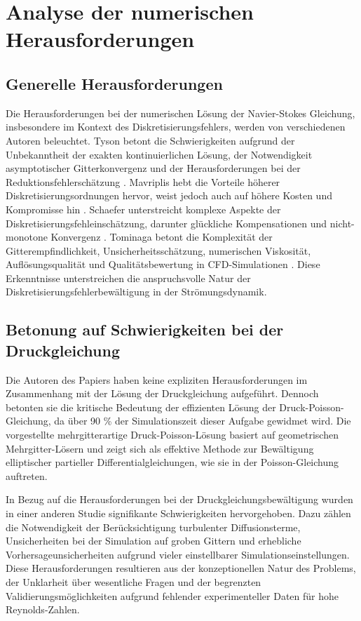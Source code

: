 \section{Analyse der numerischen Herausforderungen}

\subsection{Generelle Herausforderungen}
Die Herausforderungen bei der numerischen Lösung der Navier-Stokes Gleichung, insbesondere im Kontext des Diskretisierungsfehlers, werden von verschiedenen Autoren beleuchtet. Tyson betont die Schwierigkeiten aufgrund der Unbekanntheit der exakten kontinuierlichen Lösung, der Notwendigkeit asymptotischer Gitterkonvergenz und der Herausforderungen bei der Reduktionsfehlerschätzung \parencite{tysonHigherorderErrorEstimation2019}. Mavriplis hebt die Vorteile höherer Diskretisierungsordnungen hervor, weist jedoch auch auf höhere Kosten und Kompromisse hin \parencite{mavriplisProgressCFDDiscretizations2019}. Schaefer unterstreicht komplexe Aspekte der Diskretisierungsfehleinschätzung, darunter glückliche Kompensationen und nicht-monotone Konvergenz \parencite{schaeferApplicationCFDUncertainty2019}. Tominaga betont die Komplexität der Gitterempfindlichkeit, Unsicherheitsschätzung, numerischen Viskosität, Auflösungsqualität und Qualitätsbewertung in CFD-Simulationen \parencite{tominagaAccuracyCFDSimulations2023}. Diese Erkenntnisse unterstreichen die anspruchsvolle Natur der Diskretisierungsfehlerbewältigung in der Strömungsdynamik.

\subsection{Betonung auf Schwierigkeiten bei der Druckgleichung}
Die Autoren des Papiers \parencite{frischMeasuringComparingScaling2015} haben keine expliziten Herausforderungen im Zusammenhang mit der Lösung der Druckgleichung aufgeführt. Dennoch betonten sie die kritische Bedeutung der effizienten Lösung der Druck-Poisson-Gleichung, da über 90 \% der Simulationszeit dieser Aufgabe gewidmet wird. Die vorgestellte mehrgitterartige Druck-Poisson-Lösung basiert auf geometrischen Mehrgitter-Lösern und zeigt sich als effektive Methode zur Bewältigung elliptischer partieller Differentialgleichungen, wie sie in der Poisson-Gleichung auftreten.

In Bezug auf die Herausforderungen bei der Druckgleichungsbewältigung wurden in einer anderen Studie \parencite{heinzMathematicalSolutionComputational2023} signifikante Schwierigkeiten hervorgehoben. Dazu zählen die Notwendigkeit der Berücksichtigung turbulenter Diffusionsterme, Unsicherheiten bei der Simulation auf groben Gittern und erhebliche Vorhersageunsicherheiten aufgrund vieler einstellbarer Simulationseinstellungen. Diese Herausforderungen resultieren aus der konzeptionellen Natur des Problems, der Unklarheit über wesentliche Fragen und der begrenzten Validierungsmöglichkeiten aufgrund fehlender experimenteller Daten für hohe Reynolds-Zahlen.

